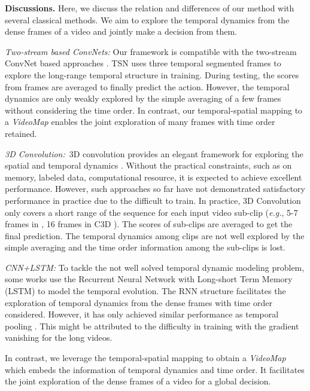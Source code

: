 \documentclass[english, 10pt, twocolumn, twoside]{IEEEtran}
\begin{document}
\noindent\textbf{Discussions.} Here, we discuss the relation and differences of our method with several classical methods. We aim to explore the temporal dynamics from the dense frames of a video and jointly make a decision from them.

\emph{Two-stream based ConvNets:} Our framework is compatible with the two-stream ConvNet based approaches \cite{simonyan2014two,wang2016temporal}. TSN \cite{wang2016temporal} uses three temporal segmented frames to explore the long-range temporal structure in training. During testing, the scores from  frames are averaged to finally predict the action. However, the temporal dynamics are only weakly explored by the simple averaging of a few frames without considering the time order. In contrast, our temporal-spatial mapping to a \emph{VideoMap} enables the joint exploration of many frames with time order retained.

\emph{3D Convolution:}~3D convolution provides an elegant framework for exploring the spatial and temporal dynamics \cite{ji20133d,tran2015learning}. Without the practical constraints, such as on memory, labeled data, computational resource, it is expected to achieve excellent performance. However, such approaches so far have not demonstrated satisfactory performance in practice due to the difficult to train. In practice, 3D Convolution only covers a short range of the sequence for each input video sub-clip (\emph{e.g.}, 5-7 frames in \cite{ji20133d}, 16 frames in C3D \cite{tran2015learning}). The scores of sub-clips are averaged to get the final prediction. The temporal dynamics among clips are not well explored by the simple averaging and the time order information among the sub-clips is lost.

\emph{CNN+LSTM:} To tackle the not well solved temporal dynamic modeling problem, some works \cite{yue2015beyond,donahue2015long,sharma2015actionattention,li2016videolstm} use the Recurrent Neural Network with Long-short Term Memory (LSTM) to model the temporal evolution. The RNN structure facilitates the exploration of temporal dynamics from the dense frames with time order considered. However, it has only achieved similar performance as temporal pooling \cite{yue2015beyond}. This might be attributed to the difficulty in training with the gradient vanishing for the long videos.

In contrast, we leverage the temporal-spatial mapping to obtain a \emph{VideoMap} which embeds the information of temporal dynamics and time order. It facilitates the joint exploration of the dense frames of a video for a global decision.
\end{document}
